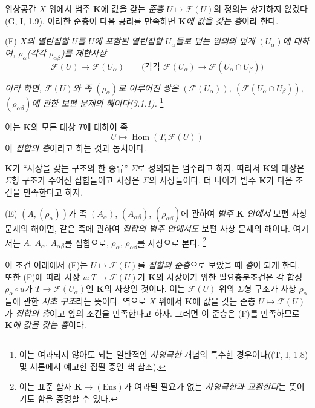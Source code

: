 \begin{env}[3.1.2]
\label{0.3.1.2-ko}
위상공간 $X$ 위에서 범주 $\mathbf K$에 값을 갖는 \emph{준층} $U\mapsto\mathcal F(U)$의 정의는 상기하지 않겠다(G, I, 1.9). 이러한 준층이 다음 공리를 만족하면 \emph{$\mathbf K$에 값을 갖는 층}이라 한다.

\smallskip
\noindent
\textup{(F)} \emph{$X$의 열린집합 $U$를 $U$에 포함된 열린집합 $U_\alpha$들로 덮는 임의의 덮개 $(U_\alpha)$에 대하여, $\rho_\alpha$(각각 $\rho_{\alpha\beta}$)를 제한사상}
\[
  \mathcal F(U)\longrightarrow\mathcal F(U_\alpha)
  \qquad
  \bigl(\text{각각 }\mathcal F(U_\alpha)
  \longrightarrow\mathcal F(U_\alpha\cap U_\beta)\bigr)
\]


\emph{이라 하면, $\mathcal F(U)$와 족 $(\rho_\alpha)$로 이루어진 쌍은 $(\mathcal F(U_\alpha))$, $(\mathcal F(U_\alpha\cap U_\beta))$, $(\rho_{\alpha\beta})$에 관한 보편 문제의 해이다(3.1.1).}%
\footnote{이는 여과되지 않아도 되는 일반적인 \emph{사영극한} 개념의 특수한 경우이다((T, I, 1.8) 및 서론에서 예고한 집필 중인 책 참조).}

이는 $\mathbf K$의 모든 대상 $T$에 대하여 족
\[
  U\longmapsto\operatorname{Hom}(T,\mathcal F(U))
\]
이 \emph{집합의 층}이라고 하는 것과 동치이다.
\end{env}

\begin{env}[3.1.3]
\label{0.3.1.3-ko}
$\mathbf K$가 ``사상을 갖는 구조의 한 종류'' $\Sigma$로 정의되는 범주라고 하자. 따라서 $\mathbf K$의 대상은 $\Sigma$형 구조가 주어진 집합들이고 사상은 $\Sigma$의 사상들이다. 더 나아가 범주 $\mathbf K$가 다음 조건을 만족한다고 하자.

\smallskip
\noindent
\textup{(E)} $(A,(\rho_\alpha))$가 족 $(A_\alpha)$, $(A_{\alpha\beta})$, $(\rho_{\alpha\beta})$에 관하여 \emph{범주 $\mathbf K$ 안에서} 보편 사상 문제의 해이면, 같은 족에 관하여 \emph{집합의 범주 안에서도} 보편 사상 문제의 해이다. 여기서는 $A$, $A_\alpha$, $A_{\alpha\beta}$를 집합으로, $\rho_\alpha$, $\rho_{\alpha\beta}$를 사상으로 본다.%
\footnote{이는 표준 함자 $\mathbf K\to(\mathrm{Ens})$가 여과될 필요가 없는 \emph{사영극한과 교환한다}는 뜻이기도 함을 증명할 수 있다.}

이 조건 아래에서 (F)는 $U\mapsto\mathcal F(U)$를 \emph{집합의 준층}으로 보았을 때 \emph{층}이 되게 한다. 또한 (F)에 따라 사상 $u:T\to\mathcal F(U)$가 $\mathbf K$의 사상이기 위한 필요충분조건은 각 합성 $\rho_\alpha\circ u$가 $T\to\mathcal F(U_\alpha)$인 $\mathbf K$의 사상인 것이다. 이는 $\mathcal F(U)$ 위의 $\Sigma$형 구조가 사상 $\rho_\alpha$들에 관한 \emph{시초 구조}라는 뜻이다. 역으로 $X$ 위에서 $\mathbf K$에 값을 갖는 준층 $U\mapsto\mathcal F(U)$가 \emph{집합의 층}이고 앞의 조건을 만족한다고 하자. 그러면 이 준층은 (F)를 만족하므로 \emph{$\mathbf K$에 값을 갖는 층}이다.
\end{env}

